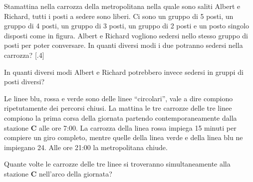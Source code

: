 \documentclass[12pt]{matemaj}
\begin{document}
\def\posto(#1,#2){\fill[rounded corners, blue] (#1+.1,#2+.1) rectangle (#1+.9,#2+.9)}
\vspace{-.3cm}
\quesitotc[10;100]
[.6]Stamattina nella carrozza della metropolitana nella quale sono saliti Albert e Richard, tutti i posti a sedere sono liberi. Ci sono un gruppo di 5 posti, un gruppo di 4 posti, un gruppo di 3 posti, un gruppo di 2 posti e un posto singolo disposti come in figura. Albert e Richard vogliono sedersi nello stesso gruppo di posti per poter conversare. In quanti diversi modi i due potranno sedersi nella carrozza?\vspace{-.3cm}
[.4]\tikspace{}\vspace{-.3cm}

\vspace{-.8cm}
\quesito[100;200]
In quanti diversi modi Albert e Richard potrebbero invece sedersi in gruppi di posti diversi?

Le linee blu, rossa e verde sono delle linee ``circolari'', vale a dire compiono ripetutamente dei percorsi chiusi. La mattina le tre carrozze delle tre linee compiono la prima corsa della giornata partendo contemporaneamente dalla stazione {\bf C} alle ore 7:00. La carrozza della linea rossa impiega 15 minuti per compiere un giro completo, mentre quelle della linea verde e della linea blu ne impiegano 24. Alle ore 21:00 la metropolitana chiude.

\quesito[1;20]
Quante volte le carrozze delle tre linee si troveranno simultaneamente alla stazione {\bf C} nell'arco della giornata?
\end{document}
